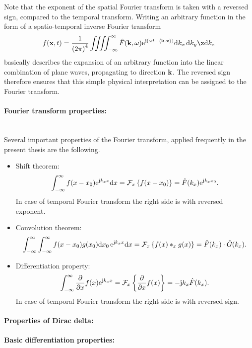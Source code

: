 Note that the exponent of the spatial Fourier transform is taken with a reversed sign, compared to the temporal transform.
Writing an arbitrary function in the form of a spatio-temporal inverse Fourier transform
\begin{equation}
f(\vx,t) = \frac{1}{\left( 2\pi \right)^4} \iiiint_ {-\infty}^{\infty} \hat{F}(\vk,\omega) \te^{ \ti \left( \omega t - \left< \vk \cdot \vx \right> \right)} \td k_x \, \td k_y \x \td k_z
\end{equation}
basically describes the expansion of an arbitrary function into the linear combination of plane waves, propagating to direction $\mathbf{k}$.
The reversed sign therefore ensures that this simple physical interpretation can be assigned to the Fourier transform.

\paragraph{Fourier transform properties:}\mbox{} \\
Several important properties of the Fourier transform, applied frequently in the present thesis are the following.
\begin{itemize}
\item Shift theorem:
\begin{equation}
\int_{-\infty}^{\infty} f(x-x_0) \mathrm{e}^{\mathrm{j} k_x x} \mathrm{d} x = \mathcal{F}_x \left\{ f(x-x_0) \right\} = \hat{F}(k_x) \mathrm{e}^{\mathrm{j} k_x x_0}.
\end{equation}
In case of temporal Fourier transform the right side is with reversed exponent.
\item Convolution theorem:
\begin{equation}
\int_{-\infty}^{\infty} \int_{-\infty}^{\infty} f(x-x_0) g(x_0) \mathrm{d} x_0 \, \mathrm{e}^{\mathrm{j} k_x x} \mathrm{d} x = \mathcal{F}_x \left\{ f(x) \ast_x g(x) \right\} = \hat{F}(k_x) \cdot \hat{G}(k_x).
\end{equation}
\item Differentiation property:
\begin{equation}
\int_{-\infty}^{\infty} \frac{\partial}{\partial x} f(x) \mathrm{e}^{\mathrm{j} k_x x} = \mathcal{F}_x \left\{ \frac{\partial}{\partial x} f(x) \right\} = 
-\mathrm{j} k_x \hat{F}(k_x).
\end{equation}
In case of temporal Fourier transform the right side is with reversed sign.
\end{itemize}


\paragraph{Properties of Dirac delta:}
\paragraph{Basic differentiation properties:}


